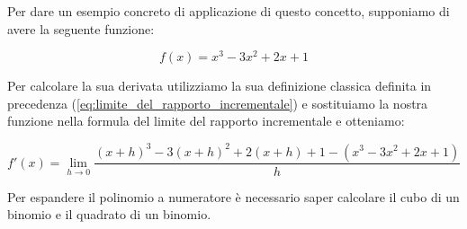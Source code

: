 \documentclass{article}
\begin{document}
\vspace{\baselineskip}

Per dare un esempio concreto di applicazione di questo concetto, supponiamo di avere la seguente funzione:

\[ f(x) = x^3 - 3x^2 + 2x + 1 \]

Per calcolare la sua derivata utilizziamo la sua definizione classica definita in precedenza (\ref{eq:limite_del_rapporto_incrementale}) e sostituiamo la nostra funzione nella formula del limite del rapporto incrementale e otteniamo:

\[ f'(x) = \lim\limits_{h \to 0} \dfrac{(x + h)^3 - 3(x + h)^2 + 2(x + h) + 1 - (x^3 - 3x^2 + 2x + 1)}{h} \]

Per espandere il polinomio a numeratore è necessario saper calcolare il cubo di un binomio e il quadrato di un binomio.
\end{document}
